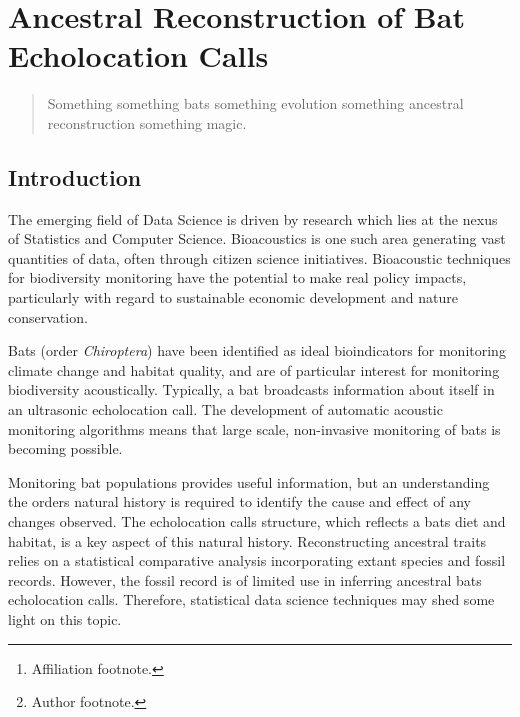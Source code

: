 \documentclass[wsdraft]{ws-rv9x6} %
\begin{document}
\chapter[Ancestral Reconstruction of Bat Echolocation Calls]{Ancestral Reconstruction of Bat Echolocation Calls}\label{ra_ch1}

\author[J.P. Meagher et al.]{J.P. Meagher\footnote{Author footnote.}}

\address{Department of Statistics,\\
University of Warwick, \\
J.Meagher@Warwick.ac.uk\footnote{Affiliation footnote.}}

\begin{abstract}
 Something something bats something evolution something ancestral reconstruction something magic.
\end{abstract}
\body

\section{Introduction}

The emerging field of Data Science is driven by research which lies at the nexus of Statistics and Computer Science. Bioacoustics is one such area generating vast quantities of data, often through citizen science initiatives. \cite{allen2006citizen} \cite{pettorelli2013indicator} Bioacoustic techniques for biodiversity monitoring \cite{stathopoulos2017bat} \cite{damoulas2010bayesian} have the potential to make real policy impacts, particularly with regard to sustainable economic development and nature conservation.

Bats (order \textit{Chiroptera}) have been identified as ideal bioindicators for monitoring climate change and habitat quality,\cite{jones2009carpe} and are of particular interest for monitoring biodiversity acoustically. Typically, a bat broadcasts information about itself in an ultrasonic echolocation call.\cite{griffin1944echolocation} The development of automatic acoustic monitoring algorithms \cite{stathopoulos2017bat} \cite{walters2012continental} means that large scale, non-invasive monitoring of bats is becoming possible.   

Monitoring bat populations provides useful information, but an understanding the orders natural history is required to identify the cause and effect of any changes observed. The echolocation calls structure, which reflects a bats diet and habitat,\cite{aldridge1987morphology}  is a key aspect of this natural history. Reconstructing ancestral traits\cite{joy2016ancestral} relies on a statistical comparative analysis incorporating extant species and fossil records. \cite{felsenstein2004inferring} However, the fossil record is of limited use in inferring ancestral bats echolocation calls. Therefore, statistical data science techniques may shed some light on this topic.
\end{document}
